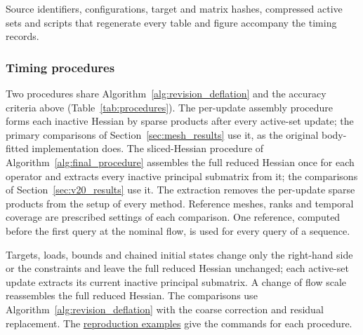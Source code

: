 Source identifiers, configurations, target and matrix hashes, compressed
active sets and scripts that regenerate every table and figure accompany the
timing records.

\subsubsection{Timing procedures}
\label{sec:final_procedure}
Two procedures share Algorithm~\ref{alg:revision_deflation} and the accuracy
criteria above (Table~\ref{tab:procedures}). The
per-update assembly procedure forms each inactive Hessian by sparse products after
every active-set update; the primary comparisons of Section~\ref{sec:mesh_results}
use it, as the original body-fitted implementation does. The sliced-Hessian procedure
of Algorithm~\ref{alg:final_procedure} assembles the full reduced Hessian once for
each operator and extracts every inactive principal submatrix from it; the comparisons
of Section~\ref{sec:v20_results} use it. The extraction removes the per-update sparse
products from the setup of every method.
Reference meshes, ranks and temporal coverage are prescribed settings of each
comparison. One reference, computed before the first query at the nominal flow, is
used for every query of a sequence.

Targets, loads, bounds and chained initial states change only the right-hand side
or the constraints and leave the full reduced Hessian unchanged; each active-set update
extracts its current inactive principal submatrix. A change of flow scale reassembles
the full reduced Hessian. The comparisons use Algorithm~\ref{alg:revision_deflation}
with the coarse correction and residual replacement. The \href{https://github.com/teeratornk/deflation-example/blob/ba682dd05b168d2f43ff0c58050813deee785223/docs/mesh-showcases.md#choose-the-numerical-procedure}
{reproduction examples} give the commands for each procedure.

